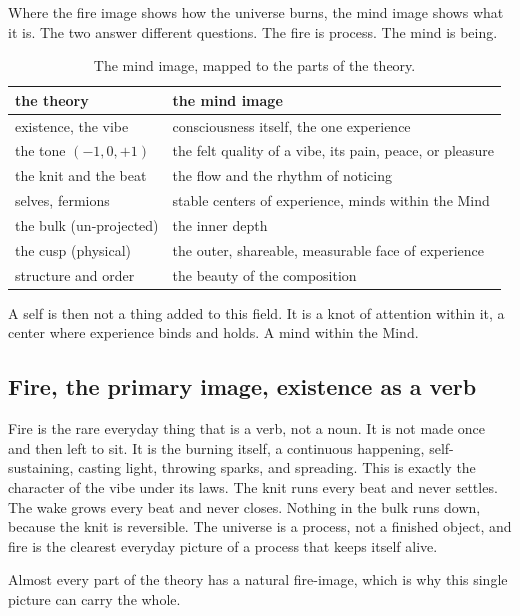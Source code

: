 Where the fire image shows how the universe burns, the mind image shows what it is. The two answer different questions. The fire is process. The mind is being.

\begin{table}[ht]
\centering
\begin{tabular}{@{}ll@{}}
\toprule
the theory & the mind image \\
\midrule
existence, the vibe & consciousness itself, the one experience \\
the tone $(-1, 0, +1)$ & the felt quality of a vibe, its pain, peace, or pleasure \\
the knit and the beat & the flow and the rhythm of noticing \\
selves, fermions & stable centers of experience, minds within the Mind \\
the bulk (un-projected) & the inner depth \\
the cusp (physical) & the outer, shareable, measurable face of experience \\
structure and order & the beauty of the composition \\
\bottomrule
\end{tabular}
\caption{The mind image, mapped to the parts of the theory.}
\label{tab:mind-image}
\end{table}

A self is then not a thing added to this field. It is a knot of attention within it, a center where experience binds and holds. A mind within the Mind.

\subsection{Fire, the primary image, existence as a verb}

Fire is the rare everyday thing that is a verb, not a noun. It is not made once and then left to sit. It is the burning itself, a continuous happening, self-sustaining, casting light, throwing sparks, and spreading. This is exactly the character of the vibe under its laws. The knit runs every beat and never settles. The wake grows every beat and never closes. Nothing in the bulk runs down, because the knit is reversible. The universe is a process, not a finished object, and fire is the clearest everyday picture of a process that keeps itself alive.

Almost every part of the theory has a natural fire-image, which is why this single picture can carry the whole.

